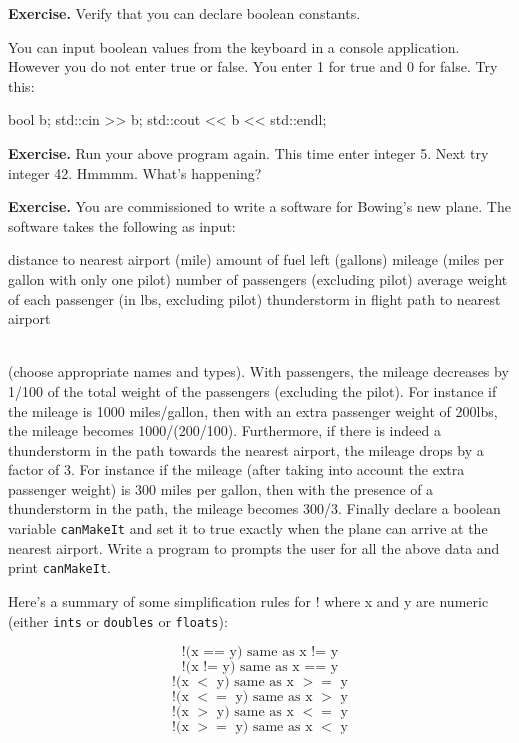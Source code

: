 {{{{{\textbf{Exercise.} Verify that you can declare boolean constants.\\


You can input boolean values from the keyboard in a console application.
However you do not enter true or false. You enter 1 for true and 0 for
false. Try this:\\
\begin{console}
bool b;
std::cin >> b;
std::cout << b << std::endl;
\end{console}
\textbf{Exercise.} Run your above program again. This time enter integer 5. Next try integer 42. Hmmmm. What's happening?

\textbf{Exercise.} You are commissioned to write a software for Bowing's new
plane. The software takes the following as input:
\begin{tightlist}
\li distance to nearest airport (mile)
\li amount of fuel left (gallons)
\li mileage (miles per gallon with only one pilot)
\li number of passengers (excluding pilot)
\li average weight of each passenger (in lbs, excluding pilot)
\li thunderstorm in flight path to nearest airport
\end{tightlist}\\
(choose appropriate names and types). With passengers, the mileage
decreases by 1/100 of the total weight of the passengers (excluding the
pilot). For instance if the mileage is 1000 miles/gallon, then with an extra
passenger weight of 200lbs, the mileage becomes 1000/(200/100).
Furthermore, if there is indeed a thunderstorm in the path towards the
nearest airport, the mileage drops by a factor of 3. For instance if the
mileage (after taking into account the extra passenger weight) is 300
miles per gallon, then with the presence of a thunderstorm in the path,
the mileage becomes 300/3. Finally declare a boolean variable
\verb!canMakeIt! and set it to true exactly when the plane can arrive at the
nearest airport. Write a program to prompts the user for all the above
data and print \verb!canMakeIt!.


Here's a summary of some simplification rules for ! where x and y are
numeric (either \verb!ints! or \verb!doubles! or \verb!floats!):

\begin{center}
\[\text{!(x == y)   same as    x != y}\]
\[\text{!(x != y)   same as    x == y}\]
\[\text{!(x $<$ y)    same as    x $>=$ y}\]
\[\text{!(x $<=$ y)   same as    x $>$ y}\]
\[\text{!(x $>$ y)   same as    x $<=$ y}\]
\[\text{!(x $>=$ y)   same as    x $<$ y}\]  
\end{center}

}}}}}
